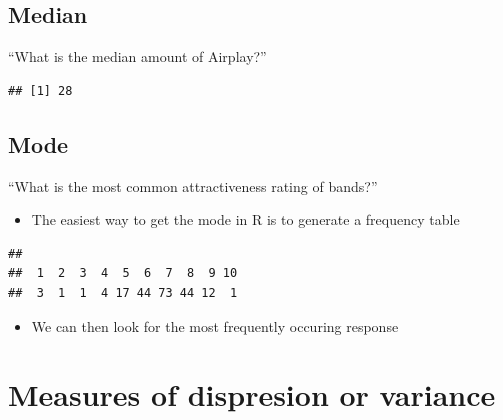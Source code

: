 \documentclass[
]{book}
\newenvironment{Shaded}{\begin{snugshade}}{\end{snugshade}}
\newcommand{\KeywordTok}[1]{\textcolor[rgb]{0.13,0.29,0.53}{\textbf{#1}}}
\newcommand{\NormalTok}[1]{#1}
\newcommand{\OperatorTok}[1]{\textcolor[rgb]{0.81,0.36,0.00}{\textbf{#1}}}
\providecommand{\tightlist}{%
  \setlength{\itemsep}{0pt}\setlength{\parskip}{0pt}}
\begin{document}
\hypertarget{median}{%
\subsection{Median}\label{median}}

``What is the median amount of Airplay?''

\begin{Shaded}
\end{Shaded}

\begin{verbatim}
## [1] 28
\end{verbatim}

\hypertarget{mode}{%
\subsection{Mode}\label{mode}}

``What is the most common attractiveness rating of bands?''

\begin{itemize}
\tightlist
\item
  The easiest way to get the mode in R is to generate a frequency table
\end{itemize}

\begin{Shaded}
\end{Shaded}

\begin{verbatim}
## 
##  1  2  3  4  5  6  7  8  9 10 
##  3  1  1  4 17 44 73 44 12  1
\end{verbatim}

\begin{itemize}
\tightlist
\item
  We can then look for the most frequently occuring response
\end{itemize}

\hypertarget{measures-of-dispresion-or-variance}{%
\section{Measures of dispresion or variance}\label{measures-of-dispresion-or-variance}}
\end{document}
